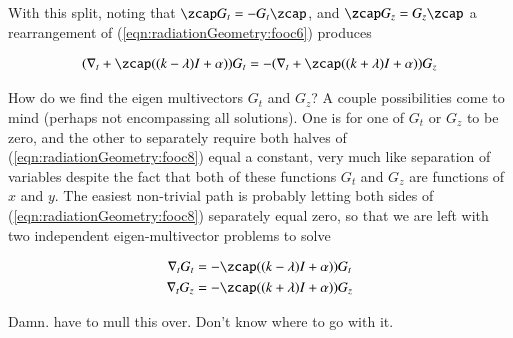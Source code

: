 With this split, noting that $\zcap G_t = -G_t \zcap$, and $\zcap G_z = G_z \zcap$ a rearrangement of (\ref{eqn:radiationGeometry:fooc6}) produces

\begin{align}\label{eqn:radiationGeometry:fooc8}
(\grad_t + \zcap ((k-\lambda) I + \alpha)) G_t = -(\grad_t + \zcap ((k+\lambda) I + \alpha)) G_z
\end{align}

How do we find the eigen multivectors $G_t$ and $G_z$?  A couple possibilities come to mind (perhaps not encompassing all solutions).  One is for one of $G_t$ or $G_z$ to be zero, and the other to separately require both halves of (\ref{eqn:radiationGeometry:fooc8}) equal a constant, very much like separation of variables despite the fact that both of these functions $G_t$ and $G_z$ are functions of $x$ and $y$.  The easiest non-trivial path is probably letting both sides of (\ref{eqn:radiationGeometry:fooc8}) separately equal zero, so that we are left with two independent eigen-multivector problems to solve

\begin{align}\label{eqn:radiationGeometry:fooc9}
\grad_t G_t &= -\zcap ((k-\lambda) I + \alpha)) G_t \\
\grad_t G_z &= -\zcap ((k+\lambda) I + \alpha)) G_z
\end{align}

Damn.  have to mull this over.  Don't know where to go with it.

\EndArticle
